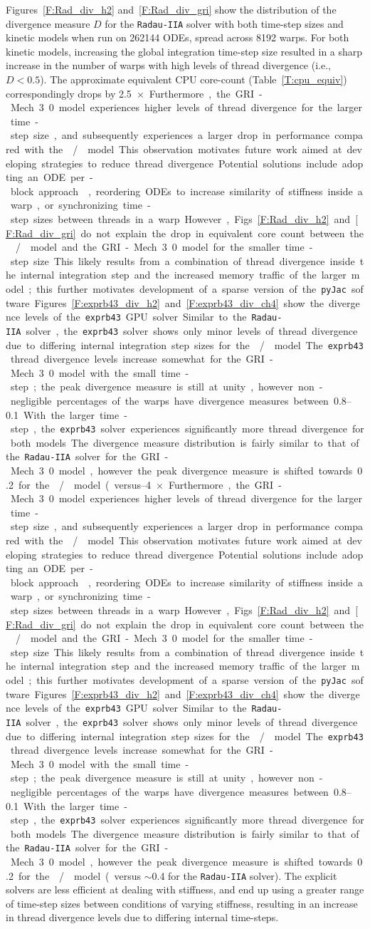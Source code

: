 \documentclass[preprint]{elsarticle}
\begin{document}
Figures~\ref{F:Rad_div_h2} and~\ref{F:Rad_div_gri} show the distribution of the divergence measure $D$ for the \texttt{Radau-IIA} solver with both time-step sizes and kinetic models when run on \num{262144} ODEs, spread across \num{8192} warps.
For both kinetic models, increasing the global integration time-step size resulted in a sharp increase in the number of warps with high levels of thread divergence (i.e., $D < 0.5$).
The approximate equivalent CPU core-count (Table~\ref{T:cpu_equiv}) correspondingly drops by \SIrange{2.5}{4}{$\times$}.
Furthermore, the GRI-Mech 3.0 model experiences higher levels of thread divergence for the larger time-step size, and subsequently experiences a larger drop in performance compared with the \slash{} model.
This observation motivates future work aimed at developing strategies to reduce thread divergence.
Potential solutions include adopting an ODE per-block approach~\cite{Stone:2013aa}, reordering ODEs to increase similarity of stiffness inside a warp, or synchronizing time-step sizes between threads in a warp.
However, Figs.~\ref{F:Rad_div_h2} and \ref{F:Rad_div_gri} do not explain the drop in equivalent core count between the \slash{} model and the GRI-Mech 3.0 model for the smaller time-step size.
This likely results from a combination of thread divergence inside the internal integration step and the increased memory traffic of the larger model; this further motivates development of a sparse version of the \texttt{pyJac} software.

Figures~\ref{F:exprb43_div_h2} and \ref{F:exprb43_div_ch4} show the divergence levels of the \texttt{exprb43} GPU solver.
Similar to the \texttt{Radau-IIA} solver, the \texttt{exprb43} solver shows only minor levels of thread divergence due to differing internal integration step sizes for the \slash{} model.
The \texttt{exprb43} thread divergence levels increase somewhat for the GRI-Mech 3.0 model with the small time-step; the peak divergence measure is still at unity, however non-negligible percentages of the warps have divergence measures between \numrange{0.8}{0.1}.
With the larger time-step, the \texttt{exprb43} solver experiences significantly more thread divergence for both models.
The divergence measure distribution is fairly similar to that of the \texttt{Radau-IIA} solver for the GRI-Mech 3.0 model, however the peak divergence measure is shifted towards \num{0.2} for the \slash{} model (versus $\sim$\num{0.4} for the \texttt{Radau-IIA} solver).
The explicit solvers are less efficient at dealing with stiffness, and end up using a greater range of time-step sizes between conditions of varying stiffness, resulting in an increase in thread divergence levels due to differing internal time-steps.
\end{document}
